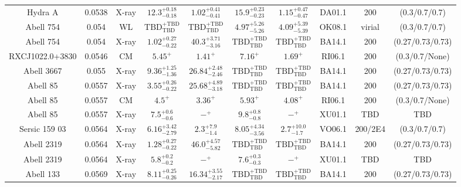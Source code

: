 \begin{table}
\begin{tabular}{cccccccccc}
Hydra A & 0.0538 & X-ray & ${12.3}^{+0.18}_{-0.18}$ & ${1.02}^{+0.41}_{-0.41}$ & ${15.9}^{+0.23}_{-0.23}$ & ${1.15}^{+0.47}_{-0.47}$ & DA01.1 & 200 & (0.3/0.7/0.7) \\
Abell 754 & 0.054 & WL & ${\mathrm{TBD}}^{+\mathrm{TBD}}_{\mathrm{TBD}}$ & ${\mathrm{TBD}}^{+\mathrm{TBD}}_{\mathrm{TBD}}$ & ${4.97}^{+5.26}_{-5.26}$ & ${4.09}^{+5.39}_{-5.39}$ & OK08.1 & virial & (0.3/0.7/0.7) \\
Abell 754 & 0.054 & X-ray & ${1.02}^{+0.27}_{-0.22}$ & ${40.3}^{+3.71}_{-3.16}$ & ${\mathrm{TBD}}^{+\mathrm{TBD}}_{\mathrm{TBD}}$ & ${\mathrm{TBD}}^{+\mathrm{TBD}}_{\mathrm{TBD}}$ & BA14.1 & 200 & (0.27/0.73/0.73) \\
RXCJ1022.0+3830 & 0.0546 & CM & ${5.45}^{+}_{}$ & ${1.41}^{+}_{}$ & ${7.16}^{+}_{}$ & ${1.69}^{+}_{}$ & RI06.1 & 200 & (0.3/0.7/None) \\
Abell 3667 & 0.055 & X-ray & ${9.36}^{+1.25}_{-1.36}$ & ${26.84}^{+2.48}_{-2.46}$ & ${\mathrm{TBD}}^{+\mathrm{TBD}}_{\mathrm{TBD}}$ & ${\mathrm{TBD}}^{+\mathrm{TBD}}_{\mathrm{TBD}}$ & BA14.1 & 200 & (0.27/0.73/0.73) \\
Abell 85 & 0.0557 & X-ray & ${3.55}^{+0.26}_{-0.22}$ & ${25.68}^{+4.89}_{-3.18}$ & ${\mathrm{TBD}}^{+\mathrm{TBD}}_{\mathrm{TBD}}$ & ${\mathrm{TBD}}^{+\mathrm{TBD}}_{\mathrm{TBD}}$ & BA14.1 & 200 & (0.27/0.73/0.73) \\
Abell 85 & 0.0557 & CM & ${4.5}^{+}_{}$ & ${3.36}^{+}_{}$ & ${5.93}^{+}_{}$ & ${4.08}^{+}_{}$ & RI06.1 & 200 & (0.3/0.7/None) \\
Abell 85 & 0.0557 & X-ray & ${7.5}^{+0.6}_{-0.6}$ & ${-}^{+}_{}$ & ${9.8}^{+0.8}_{-0.8}$ & ${-}^{+}_{}$ & XU01.1 & TBD & TBD \\
Sersic 159 03 & 0.0564 & X-ray & ${6.16}^{+3.42}_{-2.79}$ & ${2.3}^{+7.9}_{-1.4}$ & ${8.05}^{+4.34}_{-3.56}$ & ${2.7}^{+10.0}_{-1.7}$ & VO06.1 & 200/2E4 & (0.3/0.7/0.7) \\
Abell 2319 & 0.0564 & X-ray & ${1.28}^{+0.27}_{-0.22}$ & ${46.0}^{+4.57}_{-5.82}$ & ${\mathrm{TBD}}^{+\mathrm{TBD}}_{\mathrm{TBD}}$ & ${\mathrm{TBD}}^{+\mathrm{TBD}}_{\mathrm{TBD}}$ & BA14.1 & 200 & (0.27/0.73/0.73) \\
Abell 2319 & 0.0564 & X-ray & ${5.8}^{+0.2}_{-0.2}$ & ${-}^{+}_{}$ & ${7.6}^{+0.3}_{-0.3}$ & ${-}^{+}_{}$ & XU01.1 & TBD & TBD \\
Abell 133 & 0.0569 & X-ray & ${8.11}^{+0.25}_{-0.26}$ & ${16.34}^{+3.55}_{-2.17}$ & ${\mathrm{TBD}}^{+\mathrm{TBD}}_{\mathrm{TBD}}$ & ${\mathrm{TBD}}^{+\mathrm{TBD}}_{\mathrm{TBD}}$ & BA14.1 & 200 & (0.27/0.73/0.73) \\

\end{tabular}
\end{table}
